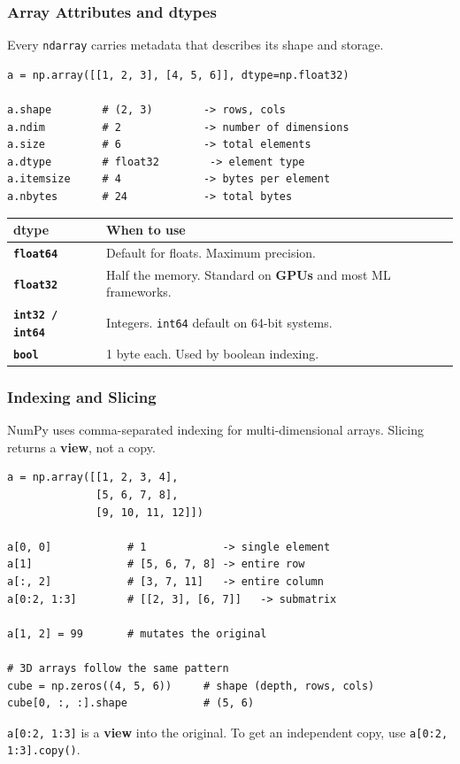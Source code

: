 \documentclass[aspectratio=169,10pt]{beamer}
\newcommand{\keyword}[1]{\textcolor{PrimaryBlue}{\textbf{#1}}}
\newcommand{\codeword}[1]{\texttt{#1}}
\newcommand{\code}[1]{\texttt{#1}}
\newenvironment{bluebox}[1]{%
  \vspace{0.08cm}\begin{tcolorbox}[lecturebox,title={#1},fontupper=\small]%
}{\end{tcolorbox}\vspace{0.05cm}}
\begin{document}
\begin{frame}[fragile]
\frametitle{Array Attributes and dtypes}
\small
Every \codeword{ndarray} carries metadata that describes its shape and storage.

\vspace{0.12cm}
\begin{lstlisting}[style=pycode]
a = np.array([[1, 2, 3], [4, 5, 6]], dtype=np.float32)

a.shape        # (2, 3)        -> rows, cols
a.ndim         # 2             -> number of dimensions
a.size         # 6             -> total elements
a.dtype        # float32        -> element type
a.itemsize     # 4             -> bytes per element
a.nbytes       # 24            -> total bytes
\end{lstlisting}

\renewcommand{\arraystretch}{1.20}
\begin{tabularx}{\linewidth}{>{\bfseries}p{2.4cm}X}
\toprule
dtype & When to use \\
\midrule
\code{float64} & Default for floats. Maximum precision. \\
\code{float32} & Half the memory. Standard on \keyword{GPUs} and most ML frameworks. \\
\code{int32 / int64} & Integers. \codeword{int64} default on 64-bit systems. \\
\code{bool} & 1 byte each. Used by boolean indexing. \\
\bottomrule
\end{tabularx}
\end{frame}


\begin{frame}[fragile]
\frametitle{Indexing and Slicing}
\small
NumPy uses comma-separated indexing for multi-dimensional arrays. Slicing returns a \keyword{view}, not a copy.

\vspace{0.12cm}
\begin{lstlisting}[style=pycode]
a = np.array([[1, 2, 3, 4],
              [5, 6, 7, 8],
              [9, 10, 11, 12]])

a[0, 0]            # 1            -> single element
a[1]               # [5, 6, 7, 8] -> entire row
a[:, 2]            # [3, 7, 11]   -> entire column
a[0:2, 1:3]        # [[2, 3], [6, 7]]   -> submatrix

a[1, 2] = 99       # mutates the original

# 3D arrays follow the same pattern
cube = np.zeros((4, 5, 6))     # shape (depth, rows, cols)
cube[0, :, :].shape            # (5, 6)
\end{lstlisting}

\begin{bluebox}{Slice vs.\ copy}
\codeword{a[0:2, 1:3]} is a \keyword{view} into the original. To get an independent copy, use \codeword{a[0:2, 1:3].copy()}.
\end{bluebox}
\end{frame}
\end{document}
